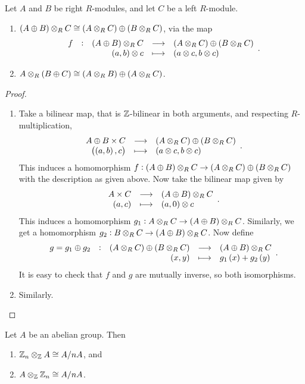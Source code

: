\pagebreak

\begin{corollary}
Let $ A $ and $ B $ be right $ R $-modules, and let $ C $ be a left $ R $-module.
\begin{enumerate}
\item $ \br{A \oplus B} \otimes_R C \cong \br{A \otimes_R C} \oplus \br{B \otimes_R C} $, via the map
$$ \function[f]{\br{A \oplus B} \otimes_R C}{\br{A \otimes_R C} \oplus \br{B \otimes_R C}}{\br{a, b} \otimes c}{\br{a \otimes c, b \otimes c}}. $$
\item $ A \otimes_R \br{B \oplus C} \cong \br{A \otimes_R B} \oplus \br{A \otimes_R C} $.
\end{enumerate}
\end{corollary}

\begin{proof}
\hfill
\begin{enumerate}
\item Take a bilinear map, that is $ \mathbb{Z} $-bilinear in both arguments, and respecting $ R $-multiplication,
$$ \function{A \oplus B \times C}{\br{A \otimes_R C} \oplus \br{B \otimes_R C}}{\br{\br{a, b}, c}}{\br{a \otimes c, b \otimes c}}. $$
This induces a homomorphism $ f : \br{A \oplus B} \otimes_R C \to \br{A \otimes_R C} \oplus \br{B \otimes_R C} $ with the description as given above. Now take the bilinear map given by
$$ \function{A \times C}{\br{A \oplus B} \otimes_R C}{\br{a, c}}{\br{a, 0} \otimes c}. $$
This induces a homomorphism $ g_1 : A \otimes_R C \to \br{A \oplus B} \otimes_R C $. Similarly, we get a homomorphism $ g_2 : B \otimes_R C \to \br{A \oplus B} \otimes_R C $. Now define
$$ \function[g = g_1 \oplus g_2]{\br{A \otimes_R C} \oplus \br{B \otimes_R C}}{\br{A \oplus B} \otimes_R C}{\br{x, y}}{g_1\br{x} + g_2\br{y}}. $$
It is easy to check that $ f $ and $ g $ are mutually inverse, so both isomorphisms.
\item Similarly.
\end{enumerate}
\end{proof}

\begin{corollary}
Let $ A $ be an abelian group. Then
\begin{enumerate}
\item $ \mathbb{Z}_n \otimes_{\mathbb{Z}} A \cong A / nA $, and
\item $ A \otimes_{\mathbb{Z}} \mathbb{Z}_n \cong A / nA $.
\end{enumerate}
\end{corollary}

